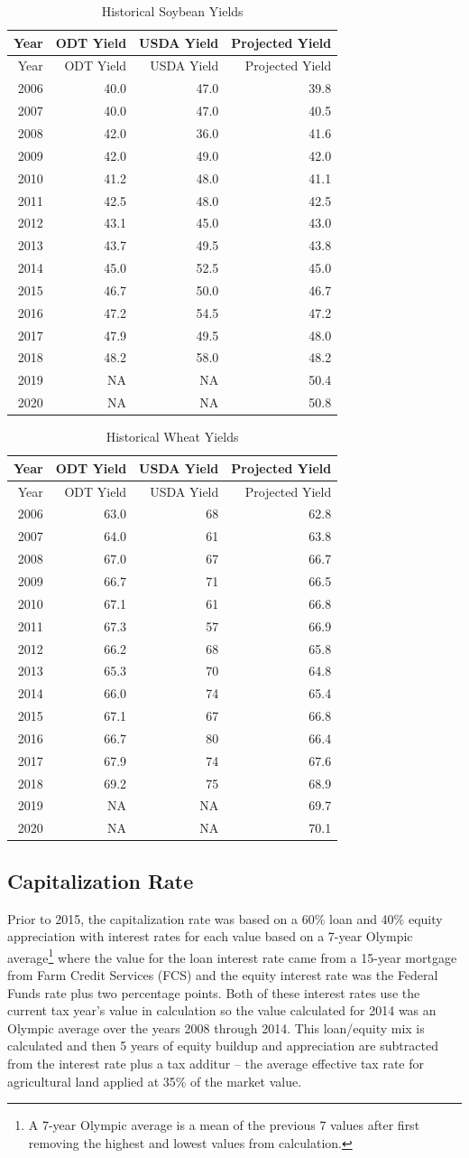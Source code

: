 \documentclass[]{article}
\let\rmarkdownfootnote\footnote%
\def\footnote{\protect\rmarkdownfootnote}
\begin{document}
\begin{longtable}[]{@{}rrrr@{}}
\caption{Historical Soybean Yields}\tabularnewline
\toprule
Year & ODT Yield & USDA Yield & Projected Yield\tabularnewline
\midrule
\endfirsthead
\toprule
Year & ODT Yield & USDA Yield & Projected Yield\tabularnewline
\midrule
\endhead
2006 & 40.0 & 47.0 & 39.8\tabularnewline
2007 & 40.0 & 47.0 & 40.5\tabularnewline
2008 & 42.0 & 36.0 & 41.6\tabularnewline
2009 & 42.0 & 49.0 & 42.0\tabularnewline
2010 & 41.2 & 48.0 & 41.1\tabularnewline
2011 & 42.5 & 48.0 & 42.5\tabularnewline
2012 & 43.1 & 45.0 & 43.0\tabularnewline
2013 & 43.7 & 49.5 & 43.8\tabularnewline
2014 & 45.0 & 52.5 & 45.0\tabularnewline
2015 & 46.7 & 50.0 & 46.7\tabularnewline
2016 & 47.2 & 54.5 & 47.2\tabularnewline
2017 & 47.9 & 49.5 & 48.0\tabularnewline
2018 & 48.2 & 58.0 & 48.2\tabularnewline
2019 & NA & NA & 50.4\tabularnewline
2020 & NA & NA & 50.8\tabularnewline
\bottomrule
\end{longtable}

\begin{longtable}[]{@{}rrrr@{}}
\caption{Historical Wheat Yields}\tabularnewline
\toprule
Year & ODT Yield & USDA Yield & Projected Yield\tabularnewline
\midrule
\endfirsthead
\toprule
Year & ODT Yield & USDA Yield & Projected Yield\tabularnewline
\midrule
\endhead
2006 & 63.0 & 68 & 62.8\tabularnewline
2007 & 64.0 & 61 & 63.8\tabularnewline
2008 & 67.0 & 67 & 66.7\tabularnewline
2009 & 66.7 & 71 & 66.5\tabularnewline
2010 & 67.1 & 61 & 66.8\tabularnewline
2011 & 67.3 & 57 & 66.9\tabularnewline
2012 & 66.2 & 68 & 65.8\tabularnewline
2013 & 65.3 & 70 & 64.8\tabularnewline
2014 & 66.0 & 74 & 65.4\tabularnewline
2015 & 67.1 & 67 & 66.8\tabularnewline
2016 & 66.7 & 80 & 66.4\tabularnewline
2017 & 67.9 & 74 & 67.6\tabularnewline
2018 & 69.2 & 75 & 68.9\tabularnewline
2019 & NA & NA & 69.7\tabularnewline
2020 & NA & NA & 70.1\tabularnewline
\bottomrule
\end{longtable}

\hypertarget{capitalization-rate}{%
\subsection{Capitalization Rate}\label{capitalization-rate}}

Prior to 2015, the capitalization rate was based on a 60\% loan and 40\%
equity appreciation with interest rates for each value based on a 7-year
Olympic average\footnote{A 7-year Olympic average is a mean of the
  previous 7 values after first removing the highest and lowest values
  from calculation.} where the value for the loan interest rate came
from a 15-year mortgage from Farm Credit Services (FCS) and the equity
interest rate was the Federal Funds rate plus two percentage points.
Both of these interest rates use the current tax year's value in
calculation so the value calculated for 2014 was an Olympic average over
the years 2008 through 2014. This loan/equity mix is calculated and then
5 years of equity buildup and appreciation are subtracted from the
interest rate plus a tax additur -- the average effective tax rate for
agricultural land applied at 35\% of the market value.
\end{document}
